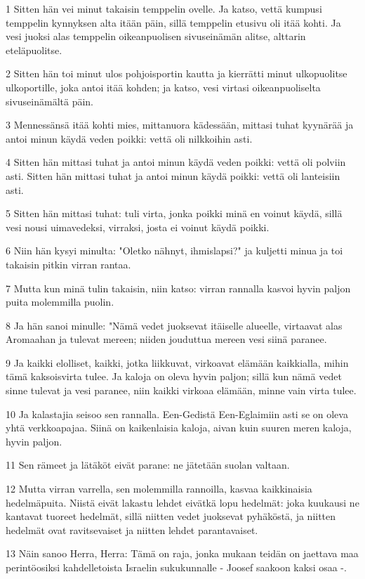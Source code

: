 \par 1 Sitten hän vei minut takaisin temppelin ovelle. Ja katso, vettä kumpusi temppelin kynnyksen alta itään päin, sillä temppelin etusivu oli itää kohti. Ja vesi juoksi alas temppelin oikeanpuolisen sivuseinämän alitse, alttarin eteläpuolitse.
\par 2 Sitten hän toi minut ulos pohjoisportin kautta ja kierrätti minut ulkopuolitse ulkoportille, joka antoi itää kohden; ja katso, vesi virtasi oikeanpuoliselta sivuseinämältä päin.
\par 3 Mennessänsä itää kohti mies, mittanuora kädessään, mittasi tuhat kyynärää ja antoi minun käydä veden poikki: vettä oli nilkkoihin asti.
\par 4 Sitten hän mittasi tuhat ja antoi minun käydä veden poikki: vettä oli polviin asti. Sitten hän mittasi tuhat ja antoi minun käydä poikki: vettä oli lanteisiin asti.
\par 5 Sitten hän mittasi tuhat: tuli virta, jonka poikki minä en voinut käydä, sillä vesi nousi uimavedeksi, virraksi, josta ei voinut käydä poikki.
\par 6 Niin hän kysyi minulta: "Oletko nähnyt, ihmislapsi?" ja kuljetti minua ja toi takaisin pitkin virran rantaa.
\par 7 Mutta kun minä tulin takaisin, niin katso: virran rannalla kasvoi hyvin paljon puita molemmilla puolin.
\par 8 Ja hän sanoi minulle: "Nämä vedet juoksevat itäiselle alueelle, virtaavat alas Aromaahan ja tulevat mereen; niiden jouduttua mereen vesi siinä paranee.
\par 9 Ja kaikki elolliset, kaikki, jotka liikkuvat, virkoavat elämään kaikkialla, mihin tämä kaksoisvirta tulee. Ja kaloja on oleva hyvin paljon; sillä kun nämä vedet sinne tulevat ja vesi paranee, niin kaikki virkoaa elämään, minne vain virta tulee.
\par 10 Ja kalastajia seisoo sen rannalla. Een-Gedistä Een-Eglaimiin asti se on oleva yhtä verkkoapajaa. Siinä on kaikenlaisia kaloja, aivan kuin suuren meren kaloja, hyvin paljon.
\par 11 Sen rämeet ja lätäköt eivät parane: ne jätetään suolan valtaan.
\par 12 Mutta virran varrella, sen molemmilla rannoilla, kasvaa kaikkinaisia hedelmäpuita. Niistä eivät lakastu lehdet eivätkä lopu hedelmät: joka kuukausi ne kantavat tuoreet hedelmät, sillä niitten vedet juoksevat pyhäköstä, ja niitten hedelmät ovat ravitsevaiset ja niitten lehdet parantavaiset.
\par 13 Näin sanoo Herra, Herra: Tämä on raja, jonka mukaan teidän on jaettava maa perintöosiksi kahdelletoista Israelin sukukunnalle - Joosef saakoon kaksi osaa -.
